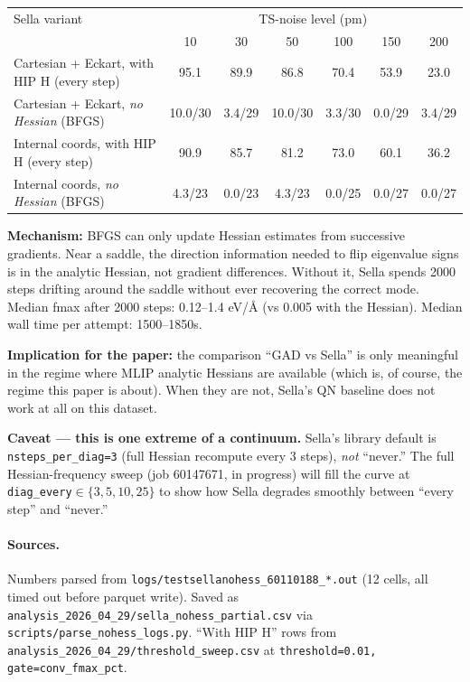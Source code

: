 \documentclass[11pt]{article}
\begin{document}
\begin{center}\small
\begin{tabular}{l|cccccc}
\toprule
Sella variant & \multicolumn{6}{c}{TS-noise level (pm)} \\
              & 10 & 30 & 50 & 100 & 150 & 200 \\
\midrule
Cartesian + Eckart, with HIP H (every step)  & 95.1 & 89.9 & 86.8 & 70.4 & 53.9 & 23.0 \\
Cartesian + Eckart, \emph{no Hessian} (BFGS) & 10.0/30 & 3.4/29 & 10.0/30 & 3.3/30 & 0.0/29 & 3.4/29 \\
Internal coords, with HIP H (every step)     & 90.9 & 85.7 & 81.2 & 73.0 & 60.1 & 36.2 \\
Internal coords, \emph{no Hessian} (BFGS)    & 4.3/23 & 0.0/23 & 4.3/23 & 0.0/25 & 0.0/27 & 0.0/27 \\
\bottomrule
\end{tabular}
\end{center}

\textbf{Mechanism:} BFGS can only update Hessian estimates from successive
gradients. Near a saddle, the direction information needed to flip eigenvalue
signs is in the analytic Hessian, not gradient differences. Without it, Sella
spends 2000 steps drifting around the saddle without ever recovering the
correct mode. Median fmax after 2000 steps: 0.12--1.4 eV/{\AA} (vs 0.005 with
the Hessian). Median wall time per attempt: 1500--1850s.

\textbf{Implication for the paper:} the comparison ``GAD vs Sella'' is only
meaningful in the regime where MLIP analytic Hessians are available (which
is, of course, the regime this paper is about). When they are not, Sella's
QN baseline does not work at all on this dataset.

\textbf{Caveat — this is one extreme of a continuum.} Sella's library
default is \texttt{nsteps\_per\_diag=3} (full Hessian recompute every 3
steps), \emph{not} ``never.'' The full Hessian-frequency sweep (job 60147671,
in progress) will fill the curve at \texttt{diag\_every}$\in\{3,5,10,25\}$
to show how Sella degrades smoothly between ``every step'' and ``never.''

\paragraph{Sources.} Numbers parsed from
\texttt{logs/testsellanohess\_60110188\_*.out} (12 cells, all timed out
before parquet write). Saved as
\texttt{analysis\_2026\_04\_29/sella\_nohess\_partial.csv} via
\texttt{scripts/parse\_nohess\_logs.py}. ``With HIP H'' rows from
\texttt{analysis\_2026\_04\_29/threshold\_sweep.csv} at
\texttt{threshold=0.01, gate=conv\_fmax\_pct}.
\end{document}
